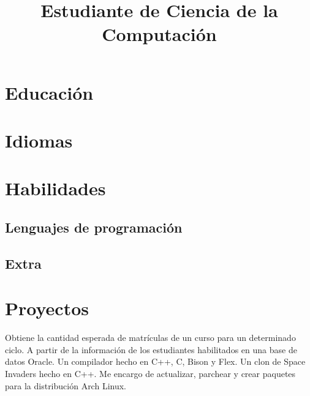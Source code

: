 \documentclass[10pt, a4paper]{moderncv}
\title{Estudiante de Ciencia de la Computación}
\begin{document}
\maketitle
\section{Educación}

\section{Idiomas}


\section{Habilidades}
\subsection{Lenguajes de programación}

\subsection{Extra}

\section{Proyectos}
{
	Obtiene la cantidad esperada de matrículas de un curso para un
	determinado ciclo.
	A partir de la información de los estudiantes habilitados en
	una base de datos Oracle.
}
{Un compilador hecho en C++, C, Bison y Flex.}
{Un clon de Space Invaders hecho en C++.}
{
	Me encargo de actualizar, parchear y crear paquetes para la distribución
	Arch Linux.
}
\end{document}
